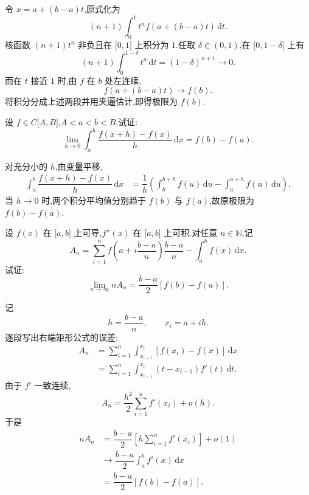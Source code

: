 \begin{solution}
    令 $x=a+(b-a)t$,原式化为
    \[
        (n+1)\int_0^1t^n f(a+(b-a)t)\,\mathrm{d}t.
    \]
    核函数 $(n+1)t^n$ 非负且在 $\lbrack0,1\rbrack$ 上积分为 $1$.任取 $\delta\in(0,1)$,在 $\lbrack0,1-\delta\rbrack$ 上有
    \[
        (n+1)\int_0^{1-\delta}t^n\,\mathrm{d}t
        =(1-\delta)^{n+1}\longrightarrow0.
    \]
    而在 $t$ 接近 $1$ 时,由 $f$ 在 $b$ 处左连续,
    \[
        f(a+(b-a)t)\longrightarrow f(b).
    \]
    将积分分成上述两段并用夹逼估计,即得极限为 $f(b)$.
\end{solution}

\begin{example}
    设 $f\in C\lbrack A,B\rbrack$,$A<a<b<B$,试证:
    \[
        \displaystyle\lim\limits_{h\to0}\int_a^b\dfrac{f(x+h)-f(x)}{h}\,\mathrm{d}x
        =f(b)-f(a).
    \]
\end{example}
\exampleblank

\begin{solution}
    对充分小的 $h$,由变量平移,
    \[
        \begin{aligned}
            \int_a^b\dfrac{f(x+h)-f(x)}{h}\,\mathrm{d}x
             & =
            \dfrac{1}{h}\left(
            \int_b^{b+h}f(u)\,\mathrm{d}u
            -\int_a^{a+h}f(u)\,\mathrm{d}u\right).
        \end{aligned}
    \]
    当 $h\to0$ 时,两个积分平均值分别趋于 $f(b)$ 与 $f(a)$,故原极限为 $f(b)-f(a)$.
\end{solution}

\begin{example}
    设 $f(x)$ 在 $\lbrack a,b\rbrack$ 上可导,$f''(x)$ 在 $\lbrack a,b\rbrack$ 上可积.对任意 $n\in\mathbb{N}$,记
    \[
        A_n=\sum\limits_{i=1}^n f\left(a+i\dfrac{b-a}{n}\right)\dfrac{b-a}{n}
        -\int_a^b f(x)\,\mathrm{d}x.
    \]
    试证:
    \[
        \displaystyle\lim\limits_{n\to\infty}nA_n
        =\dfrac{b-a}{2}[f(b)-f(a)].
    \]
\end{example}
\exampleblank

\begin{solution}
    记
    \[
        h=\dfrac{b-a}{n},
        \qquad x_i=a+ih.
    \]
    逐段写出右端矩形公式的误差:
    \[
        \begin{aligned}
            A_n
             & =\sum\limits_{i=1}^{n}
            \int_{x_{i-1}}^{x_i}[f(x_i)-f(x)]\,\mathrm{d}x \\
             & =\sum\limits_{i=1}^{n}
            \int_{x_{i-1}}^{x_i}(t-x_{i-1})f'(t)\,\mathrm{d}t.
        \end{aligned}
    \]
    由于 $f'$ 一致连续,
    \[
        A_n=\dfrac{h^2}{2}
        \sum\limits_{i=1}^{n}f'(x_i)+o(h).
    \]
    于是
    \[
        \begin{aligned}
            nA_n
             & =\dfrac{b-a}{2}
            \left[h\sum\limits_{i=1}^{n}f'(x_i)\right]+o(1) \\
             & \longrightarrow\dfrac{b-a}{2}
            \int_a^b f'(x)\,\mathrm{d}x                     \\
             & =\dfrac{b-a}{2}[f(b)-f(a)].
        \end{aligned}
    \]
\end{solution}

